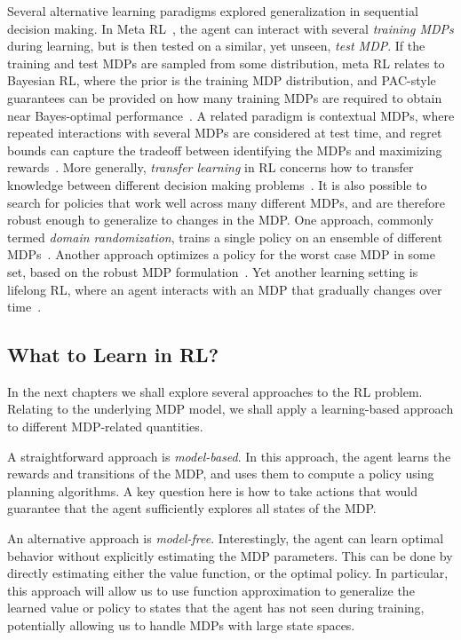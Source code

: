 Several alternative learning paradigms explored generalization in sequential decision making. In Meta RL~\cite{beck2023survey}, the agent can interact with several \textit{training MDPs} during learning, but is then tested on a similar, yet unseen, \textit{test MDP}. If the training and test MDPs are sampled from some distribution, meta RL relates to Bayesian RL, where the prior is the training MDP distribution, and PAC-style guarantees can be provided on how many training MDPs are required to obtain near Bayes-optimal performance~\cite{tamar2022regularization}. A related paradigm is contextual MDPs, where repeated interactions with several MDPs are considered at test time, and regret bounds can capture the tradeoff between identifying the MDPs and maximizing rewards~\cite{hallak2015contextual}.
More generally, \textit{transfer learning} in RL concerns how to transfer knowledge between different decision making problems~\cite{taylor2009transfer,kirk2023survey}.
It is also possible to search for policies that work well across many different MDPs, and are therefore robust enough to generalize to changes in the MDP. One approach, commonly termed \textit{domain randomization}, trains a single policy on an ensemble of different MDPs~\cite{tobin2017domain}. Another approach optimizes a policy for the worst case MDP in some set, based on the robust MDP formulation~\cite{nilim2005robust}. Yet another learning setting is lifelong RL, where an agent interacts with an MDP that gradually changes over time~\cite{khetarpal2022towards}.


\subsection{What to Learn in RL?}
In the next chapters we shall explore several approaches to the RL problem. Relating to the underlying MDP model, we shall apply a learning-based approach to different MDP-related quantities. 

A straightforward approach is \textit{model-based}. In this approach, the agent learns the rewards and transitions of the MDP, and uses them to compute a policy using planning algorithms. A key question here is how to take actions that would guarantee that the agent sufficiently explores all states of the MDP.

An alternative approach is \textit{model-free}. Interestingly, the agent can learn optimal behavior without explicitly estimating the MDP parameters. This can be done by directly estimating either the value function, or the optimal policy. In particular, this approach will allow us to use function approximation to generalize the learned value or policy to states that the agent has not seen during training, potentially allowing us to handle MDPs with large state spaces.

